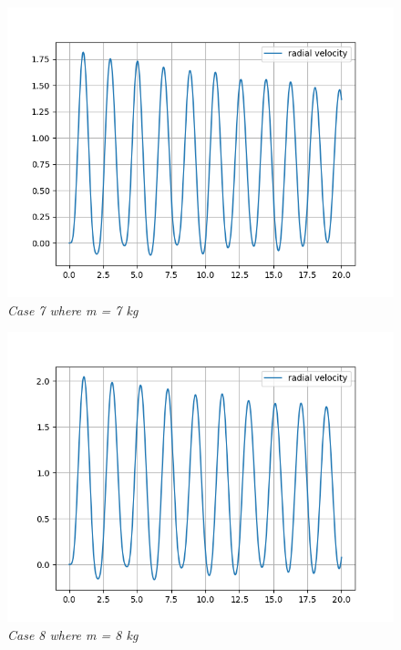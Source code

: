         \begin{figure}[H]
            \centering
            \includegraphics{Appendix/RSimPictures/R/rm7.png}
            \caption{\textit{Case 7 where m = 7 kg}}
            \label{}
        \end{figure}
            
        \begin{figure}[H]
            \centering
            \includegraphics{Appendix/RSimPictures/R/rm8.png}
            \caption{\textit{Case 8 where m = 8 kg}}
            \label{}
        \end{figure}
            
